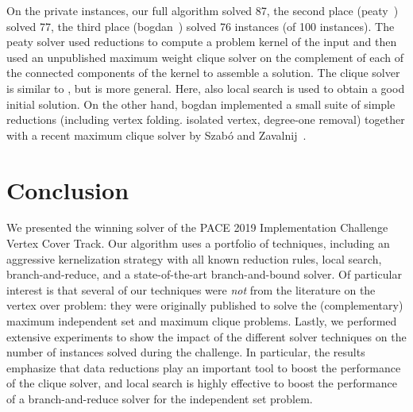 \documentclass[twoside,leqno,twocolumn]{article}
\begin{document}
On the private instances, our full algorithm solved 87, the second place (\textsf{peaty}~\cite{james_trimble_2019_3082356}) solved 77, the third place (\textsf{bogdan}~\cite{zbogdan_2019_3228802}) solved 76 instances (of 100 instances). The \textsf{peaty} solver used reductions to compute a problem kernel of the input and then used an unpublished maximum weight clique solver on the complement of each of the connected components of the kernel to assemble a solution. The clique solver is similar to \cite{DBLP:conf/aaai/LiQ10}, but is more general. Here, also local search is used to obtain a good initial solution. On the other hand, \textsf{bogdan} implemented a small suite of simple reductions (including vertex folding. isolated vertex, degree-one removal) together with a recent maximum clique solver by Szab\'o and Zavalnij~\cite{szabo2018different}.


\section{Conclusion}
We presented the winning solver of the PACE 2019 Implementation Challenge Vertex Cover Track. Our algorithm uses a portfolio of techniques, including an aggressive kernelization strategy with all known reduction rules, local search, branch-and-reduce, and a state-of-the-art branch-and-bound solver. Of particular interest is that several of our techniques were \emph{not} from the literature on the vertex over problem: they were originally published to solve the (complementary) maximum independent set and maximum clique problems. Lastly, we performed extensive experiments to show the impact of the different solver techniques on the number of instances solved during the challenge. In particular, the results emphasize that data reductions play an important tool to boost the performance of the clique solver, and local search is highly effective to boost the performance of a branch-and-reduce solver for the independent set problem.



\vfill
\end{document}

